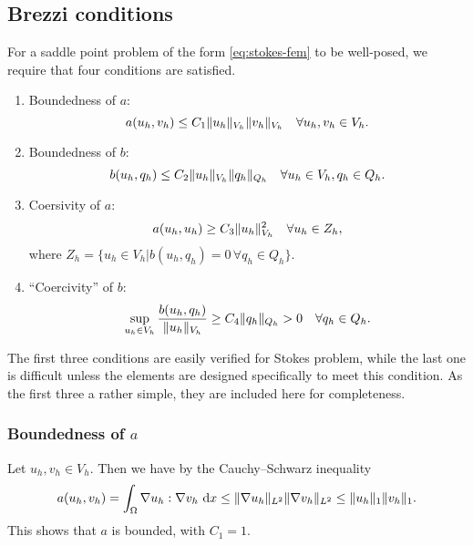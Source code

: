 \subsection{Brezzi conditions}
For a saddle point problem of the form \cref{eq:stokes-fem} to be well-posed, we require that four conditions are satisfied.
\begin{enumerate}
    \item Boundedness of $a$:
        \begin{equation}
            a(u_h, v_h) \leq C_1 \lVert u_h\rVert_{V_h} \lVert v_{h}\rVert_{V_h}
            \quad
            \forall u_h, v_h \in V_h.
        \end{equation}

    \item Boundedness of $b$:
        \begin{equation}
            b(u_h, q_h) \leq C_2 \lVert u_h\rVert_{V_h} \lVert q_{h}\rVert_{Q_h}
            \quad
            \forall {
                u_h \in V_h,
                q_h \in Q_h.
            }
        \end{equation}

    \item Coersivity of $a$:
        \begin{equation}
            a(u_h, u_h) \geq C_3 \lVert u_h\rVert_{V_h}^2
            \quad
            \forall u_h \in Z_h,
        \end{equation}
        where $Z_h = \{ u_h \in V_h | b(u_h, q_h) = 0 \, \forall q_h \in Q_h \}$.

    \item ``Coercivity'' of $b$:
        \begin{equation}
            \sup_{u_h \in V_h} \frac{
                b(u_h, q_h)
            }{
                \lVert u_h\rVert_{V_h}
            } \geq C_4 \lVert q_h\rVert_{Q_h}
            > 0
            \quad
            \forall q_h \in Q_h.
        \end{equation}
\end{enumerate}
The first three conditions are easily verified for Stokes problem, while the last one is difficult unless the elements are designed specifically to meet this condition.
As the first three a rather simple, they are included here for completeness.

\subsubsection{Boundedness of \texorpdfstring{$a$}{a}}
Let $u_h, v_h \in V_h$.
Then we have by the Cauchy--Schwarz inequality %
\begin{equation}
    a(u_h, v_h)
    = \int_{\Omega} \nabla u_h : \nabla v_h \, \mathop{}\!\mathrm{d} x
    \leq \lVert\nabla u_h\rVert_{L^2} \lVert\nabla v_h\rVert_{L^2}
    \leq \lVert u_h\rVert_1 \lVert v_h\rVert_1.
\end{equation}
This shows that $a$ is bounded, with $C_1 = 1$.

